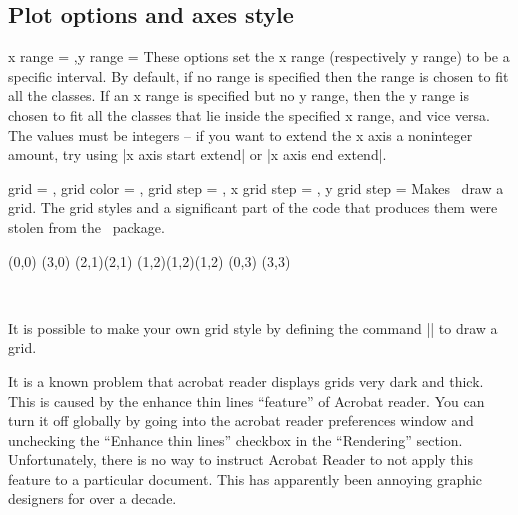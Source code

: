 \begin{sseqdata}[|| name = ex1, cohomological Serre grading]
\subsection{Plot options and axes style}
\begin{keylist}{x range = ,y range = }
These options set the x range (respectively y range) to be a specific interval. By default, if no range is specified then the range is chosen to fit all the classes. If an x range is specified but no y range, then the y range is chosen to fit all the classes that lie inside the specified x range, and vice versa. The values must be integers -- if you want to extend the x axis a noninteger amount, try using |x axis start extend| or |x axis end extend|.
\end{keylist}

\begin{keylist}{
    grid = ,
    grid color = ,
    grid step = ,
    x grid step = ,
    y grid step = 
}
Makes \sseqpages\  draw a grid. The grid styles and a significant part of the code that produces them were stolen from the \sseqpkg\ package.
\begin{codeexample}[vbox]
\begin{sseqdata}[ name = grid example, scale = 0.8 ]
\class(0,0)
\class(3,0)
\class(2,1)\class(2,1)
\class(1,2)\class(1,2)\class(1,2)
\class(0,3)
\class(3,3)
\end{sseqdata}
\hbox{
\qquad
\printpage[ name = grid example, grid = crossword ]
\qquad
\printpage[ name = grid example, grid = dots ]
}
\vskip20pt
\hbox{
\printpage[ name = grid example, grid = go ]
\qquad
\printpage[ name = grid example, grid = none ]
}
\end{codeexample}
It is possible to make your own grid style by defining the command |\sseq@grid@yourgridname| to draw a grid.

It is a known problem that acrobat reader displays grids very dark and thick. This is caused by the enhance thin lines ``feature'' of Acrobat reader. You can turn it off globally by going into the acrobat reader preferences window and unchecking the ``Enhance thin lines'' checkbox in the ``Rendering'' section. Unfortunately, there is no way to instruct Acrobat Reader to not apply this feature to a particular document. This has apparently been annoying graphic designers for over a decade.


\end{keylist}
\end{sseqdata}
